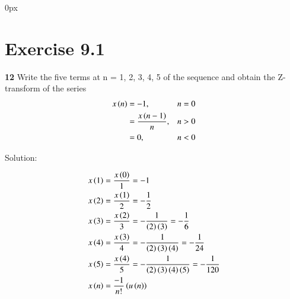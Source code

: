 \documentclass[journal,12pt,twocolumn]{IEEEtran}
\begin{document}
\parindent 0px


\vspace{3cm}

\title{}
\author{EE23BTECH11217 - Prajwal M$^{*}$
}
\maketitle
\newpage
\bigskip



\section*{Exercise 9.1}

\noindent \textbf{12} \hspace{2pt}Write the five terms at n = 1, 2, 3, 4, 5 of the sequence and obtain the Z-transform of the series
\begin{align}
    x \left(n\right) &=  -1, & n = 0 \\
    &=   \frac{x \left(n-1\right)}{n}, & n > 0\\
    &=   0, & n < 0 
\end{align}

\noindent Solution:

\noindent
\begin{align}
	x \left(1\right) & = \frac{x \left(0\right)}{1} = -1 \\
x \left(2\right) & = \frac{x \left(1\right)}{2} = -\frac{1}{2} \\
	x \left(3\right) & = \frac{x \left(2\right)}{3} = -\frac{1}{\left(2\right) \left(3\right)} = -\frac{1}{6}\\
	x \left(4\right) & = \frac{x \left(3\right)}{4} = -\frac{1}{\left(2\right)   \left(3\right) \left(4\right)} = -\frac{1}{24}\\
	x \left(5\right) & = \frac{x \left(4\right)}{5} = -\frac{1}{\left(2\right) \left(3\right) \left(4\right) \left(5\right)} = -\frac{1}{120} \\
    x \left(n\right) & = \frac{-1}{n!}  \left(u \left(n\right)\right) \label{x(n)}
\end{align}
\end{document}
